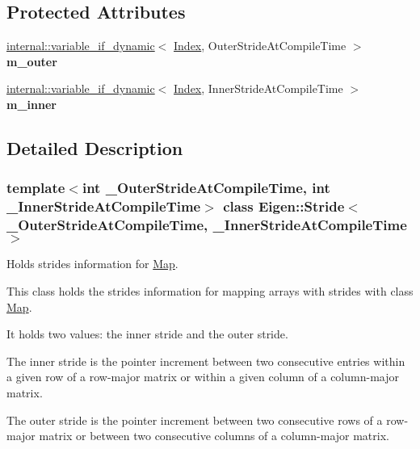 \subsection*{Protected Attributes}
\begin{DoxyCompactItemize}
\item 
\mbox{\label{class_eigen_1_1_stride_a51b8ad2f1cd7da4c8db87c34240e9d71}} 
\mbox{\hyperlink{class_eigen_1_1internal_1_1variable__if__dynamic}{internal\+::variable\+\_\+if\+\_\+dynamic}}$<$ \mbox{\hyperlink{class_eigen_1_1_stride_a96c2dfb0ce43fd8e19adcdf6094f5f63}{Index}}, Outer\+Stride\+At\+Compile\+Time $>$ {\bfseries m\+\_\+outer}
\item 
\mbox{\label{class_eigen_1_1_stride_a814628314f01f4d2f9dad719c3d3b6b4}} 
\mbox{\hyperlink{class_eigen_1_1internal_1_1variable__if__dynamic}{internal\+::variable\+\_\+if\+\_\+dynamic}}$<$ \mbox{\hyperlink{class_eigen_1_1_stride_a96c2dfb0ce43fd8e19adcdf6094f5f63}{Index}}, Inner\+Stride\+At\+Compile\+Time $>$ {\bfseries m\+\_\+inner}
\end{DoxyCompactItemize}


\subsection{Detailed Description}
\subsubsection*{template$<$int \+\_\+\+Outer\+Stride\+At\+Compile\+Time, int \+\_\+\+Inner\+Stride\+At\+Compile\+Time$>$\newline
class Eigen\+::\+Stride$<$ \+\_\+\+Outer\+Stride\+At\+Compile\+Time, \+\_\+\+Inner\+Stride\+At\+Compile\+Time $>$}

Holds strides information for \mbox{\hyperlink{class_eigen_1_1_map}{Map}}. 

This class holds the strides information for mapping arrays with strides with class \mbox{\hyperlink{class_eigen_1_1_map}{Map}}.

It holds two values\+: the inner stride and the outer stride.

The inner stride is the pointer increment between two consecutive entries within a given row of a row-\/major matrix or within a given column of a column-\/major matrix.

The outer stride is the pointer increment between two consecutive rows of a row-\/major matrix or between two consecutive columns of a column-\/major matrix.

